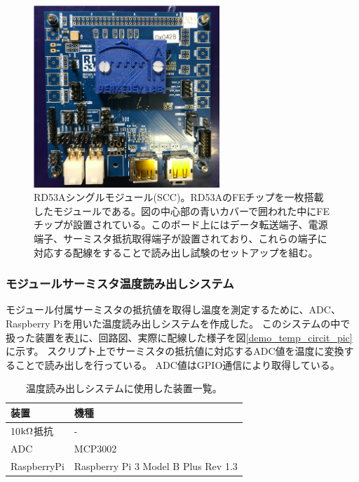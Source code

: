 \begin{figure}[h]\centering
\includegraphics[width=7cm]{./rd53a_SCC.png}
\caption[RD53Aシングルモジュール(SCC)]{RD53Aシングルモジュール(SCC)\cite{5-10}。RD53AのFEチップを一枚搭載したモジュールである。図の中心部の青いカバーで囲われた中にFEチップが設置されている。このボード上にはデータ転送端子、電源端子、サーミスタ抵抗取得端子が設置されており、これらの端子に対応する配線をすることで読み出し試験のセットアップを組む。}
\label{demo_rd53a_SCC}
\end{figure}

\subsubsection{モジュールサーミスタ温度読み出しシステム}
モジュール付属サーミスタの抵抗値を取得し温度を測定するために、ADC、Raspberry Piを用いた温度読み出しシステムを作成した。
このシステムの中で扱った装置を表\ref{demo_temp_device}に、回路図、実際に配線した様子を図\ref{demo_temp_circit_pic}に示す。
スクリプト上でサーミスタの抵抗値に対応するADC値を温度に変換することで読み出しを行っている。
ADC値はGPIO通信\cite{5-9}により取得している。

\begin{table}[tbp]
\begin{center}
\caption[温度読み出しシステムに使用した装置一覧]{温度読み出しシステムに使用した装置一覧。}
\label{demo_temp_device}
  \small
  \begin{tabular}{|ll|} \hline
    装置 & 機種 \\ \hline
    10$\rm{k\Omega}$抵抗 & - \\
    ADC & MCP3002\cite{5-3} \\  
    RaspberryPi &  Raspberry Pi 3 Model B Plus Rev 1.3\cite{5-4} \\ \hline 
  \end{tabular}
\end{center}
\end{table}

